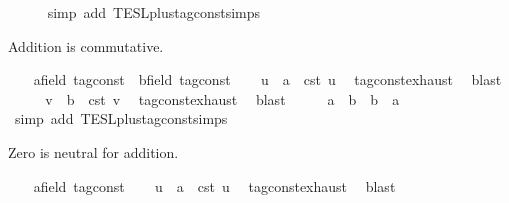 \begin{isabellebody}
\ \ \ \ \isamarkupfalse%
\ {\isacharparenleft}simp\ add{\isacharcolon}\ TESL{\isachardot}plus{\isacharunderscore}tag{\isacharunderscore}const{\isachardot}simps{\isacharparenright}\isanewline
{}\isamarkupfalse%
%
\begin{isamarkuptext}%
Addition is commutative.%
\end{isamarkuptext}\isamarkuptrue%
\ \ \isamarkupfalse%
\ a{\isacharcolon}{\isacharcolon}{\isacartoucheopen}{\isacharprime}{\isasymtau}{\isacharcolon}{\isacharcolon}field\ tag{\isacharunderscore}const{\isacartoucheclose}\ \ b{\isacharcolon}{\isacharcolon}{\isacartoucheopen}{\isacharprime}{\isasymtau}{\isacharcolon}{\isacharcolon}field\ tag{\isacharunderscore}const{\isacartoucheclose}\isanewline
\ \ \isamarkupfalse%
\ u\ \ {\isacartoucheopen}a\ {\isacharequal}\ {\isasymtau}\isactrlsub c\isactrlsub s\isactrlsub t\ u{\isacartoucheclose}\ \isamarkupfalse%
\ tag{\isacharunderscore}const{\isachardot}exhaust\ \isamarkupfalse%
\ blast\isanewline
\ \ \isamarkupfalse%
\ \isamarkupfalse%
\ v\ \ {\isacartoucheopen}b\ {\isacharequal}\ {\isasymtau}\isactrlsub c\isactrlsub s\isactrlsub t\ v{\isacartoucheclose}\ \isamarkupfalse%
\ tag{\isacharunderscore}const{\isachardot}exhaust\ \isamarkupfalse%
\ blast\isanewline
\ \ \isamarkupfalse%
\ \isamarkupfalse%
\ {\isacartoucheopen}a\ {\isacharplus}\ b\ {\isacharequal}\ b\ {\isacharplus}\ a{\isacartoucheclose}\isanewline
\ \ \ \ \isamarkupfalse%
\ {\isacharparenleft}simp\ add{\isacharcolon}\ TESL{\isachardot}plus{\isacharunderscore}tag{\isacharunderscore}const{\isachardot}simps{\isacharparenright}\isanewline
{}\isamarkupfalse%
%
\begin{isamarkuptext}%
Zero is neutral for addition.%
\end{isamarkuptext}\isamarkuptrue%
\ \ \isamarkupfalse%
\ a{\isacharcolon}{\isacharcolon}{\isacartoucheopen}{\isacharprime}{\isasymtau}{\isacharcolon}{\isacharcolon}field\ tag{\isacharunderscore}const{\isacartoucheclose}\isanewline
\ \ \isamarkupfalse%
\ u\ \ {\isacartoucheopen}a\ {\isacharequal}\ {\isasymtau}\isactrlsub c\isactrlsub s\isactrlsub t\ u{\isacartoucheclose}\ \isamarkupfalse%
\ tag{\isacharunderscore}const{\isachardot}exhaust\ \isamarkupfalse%
\ blast\isanewline

\end{isabellebody}

